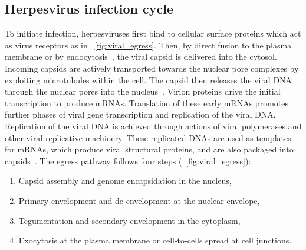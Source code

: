 \subsection{Herpesvirus infection cycle}
To initiate infection, herpesviruses first bind to cellular surface proteins which act as virus receptors as in \figurename~\ref{fig:viral_egress}.
Then, by direct fusion to the plasma membrane or by endocytosis~\cite{[8]}, the viral \gls{capsid} is delivered into the cytosol.
Incoming capsids are actively transported towards the nuclear pore complexes by exploiting microtubules within the cell\cite{[9, 10]}.
The capsid then releases the viral DNA through the nuclear pores into the nucleus~\cite{[11]}.
Virion proteins drive the initial transcription to produce %
mRNAs.
Translation of these early mRNAs promotes further phases of viral gene transcription and replication of the viral DNA.
Replication of the viral DNA is achieved through actions of viral polymerases and other viral replicative machinery.
These replicated DNAs are used as templates for mRNAs, which produce viral structural proteins, and are also packaged into capsids~\cite{[4]}.
The egress pathway follows four steps (\figurename~\ref{fig:viral_egress}):

\begin{samepage}
  \begin{enumerate}
    \item Capsid assembly and genome encapsidation in the nucleus,
    \item Primary envelopment and de-envelopment at the nuclear envelope,
    \item Tegumentation and secondary envelopment in the cytoplasm,
    \item Exocytosis at the plasma membrane or cell-to-cells spread at cell junctions.
  \end{enumerate}
\end{samepage}

